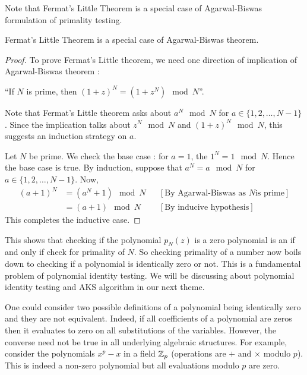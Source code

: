 Note that Fermat's Little Theorem is a special case of Agarwal-Biswas
formulation of primality testing.
\begin{claim}
Fermat's Little Theorem is a special case of Agarwal-Biswas theorem.
\end{claim}
\begin{proof}
	To prove Fermat's Little theorem, we need one direction of implication
	of Agarwal-Biswas theorem : 
	\begin{center}
	``If $N$ is prime, then $(1+z)^N = (1+z^N) \mod N$''.
	\end{center}

	Note that Fermat's Little theorem asks about $a^N \mod N$ for $a \in
	\{1,2,\ldots,N-1\}$. Since the implication talks about $z^N \mod N$
	and $(1+z)^N \mod N$, this suggests an induction strategy on $a$.

	Let $N$ be prime. We check the base case : for $a=1$, the
	$1^N =1 \mod N$. Hence the base case is true. By induction, suppose
	that $a^N = a \mod N$ for $a \in \{1,2,\ldots, N-1\}$. Now, 
	\begin{align*}
		(a+1)^N & = (a^N +1) \mod N && [\text{By Agarwal-Biswas as $N$
		is prime}]\\
		& = (a+1) \mod N && [\text{By inducive hypothesis}]
	\end{align*}
	This completes the inductive case. 
\end{proof}

This shows that checking if the polynomial $p_N(z)$ is a zero polynomial is an if and only if check for primality of $N$. 
So checking primality of a number now boils down to checking if a polynomial is identically zero or not. This is a fundamental problem of polynomial identity testing. We will be discussing about polynomial identity testing and AKS algorithm in our next theme.

\begin{remark}
One could consider two possible definitions of a polynomial being identically zero and they are not equivalent. Indeed, if all coefficients of a polynomial are zeros then it evaluates to zero on all substitutions of the variables. However, the converse need not be true in all underlying algebraic structures. For example, consider the polynomials $x^p -  x$ in a field ${\mathbb{Z}}_p$ (operations are $+$ and $\times$ modulo $p$). This is indeed a non-zero polynomial but all evaluations modulo $p$ are zero.
\end{remark}
